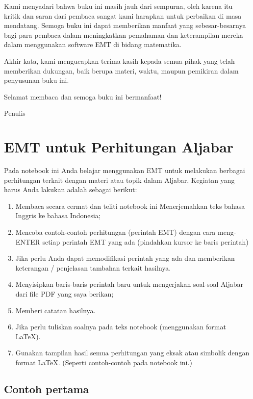 \documentclass[
]{book}
\providecommand{\tightlist}{%
  \setlength{\itemsep}{0pt}\setlength{\parskip}{0pt}}
\begin{document}
Kami menyadari bahwa buku ini masih jauh dari sempurna, oleh karena itu kritik dan saran dari pembaca sangat kami harapkan untuk perbaikan di masa mendatang. Semoga buku ini dapat memberikan manfaat yang sebesar-besarnya bagi para pembaca dalam meningkatkan pemahaman dan keterampilan mereka dalam menggunakan software EMT di bidang matematika.

Akhir kata, kami mengucapkan terima kasih kepada semua pihak yang telah memberikan dukungan, baik berupa materi, waktu, maupun pemikiran dalam penyusunan buku ini.

Selamat membaca dan semoga buku ini bermanfaat!

Penulis

\chapter{EMT untuk Perhitungan Aljabar}\label{emt-untuk-perhitungan-aljabar}

Pada notebook ini Anda belajar menggunakan EMT untuk melakukan berbagai perhitungan terkait dengan materi atau topik dalam Aljabar. Kegiatan yang harus Anda lakukan adalah sebagai berikut:

\begin{enumerate}
\def\labelenumi{\arabic{enumi}.}
\tightlist
\item
  Membaca secara cermat dan teliti notebook ini Menerjemahkan teks bahasa Inggris ke bahasa Indonesia;
\item
  Mencoba contoh-contoh perhitungan (perintah EMT) dengan cara meng-ENTER setiap perintah EMT yang ada (pindahkan kursor ke baris perintah)
\item
  Jika perlu Anda dapat memodifikasi perintah yang ada dan memberikan keterangan / penjelasan tambahan terkait hasilnya.
\item
  Menyisipkan baris-baris perintah baru untuk mengerjakan soal-soal Aljabar dari file PDF yang saya berikan;
\item
  Memberi catatan hasilnya.
\item
  Jika perlu tuliskan soalnya pada teks notebook (menggunakan format LaTeX).
\item
  Gunakan tampilan hasil semua perhitungan yang eksak atau simbolik dengan format LaTeX. (Seperti contoh-contoh pada notebook ini.)
\end{enumerate}

\section{Contoh pertama}\label{contoh-pertama}
\end{document}
